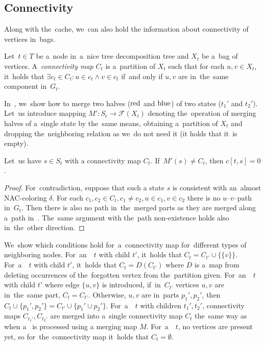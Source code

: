 \subsection{Connectivity}

Along with the~cache, we~can also hold the information about connectivity of
vertices in~bags.
%
\begin{definition}
	Let~\( t \in T \) be a~node in~a~nice tree decomposition tree and
	\( X_t \) be a~bag of vertices.
	A~\emph{connectivity map} \( C_t \) is a~partition of \( X_t \) such that
	for each \( u, v \in X_t \), it~holds that
	\( {\exists c_t \in C_t} : {u \in c_t \land v \in c_t} \) if~and only if
	\( u, v \) are in~the~same component in~\( G_t \).
\end{definition}
%

In~, we~show how to merge
two halves (\( \text{red} \) and \( \text{blue} \)) of two states (\( t_1' \) and \( t_2' \)).
Let~us introduce mapping \( M': S_t \to \mathcal{F}(X_t) \) denoting
the~operation of merging halves of a~single state by the~same means,
obtaining a~partition of \( X_t \) and dropping
the~neighboring relation as we~do not need it
(it holds that it~is empty).
%
\begin{lemma}
	Let~us have \( s \in S_t \) with a connectivity map \( C_t \).
	If~\( M'(s) \ne C_t \), then \( c[t, s] = 0 \).
\end{lemma}
%
\begin{proof}
	For~contradiction, suppose that such a state \( s \)
	is consistent with an~almost NAC-coloring \( \delta \).
	For each \( c_1, c_2 \in C_t, c_1 \ne c_2, u \in c_1, v \in c_2 \)
	there is no \( u \)--\( v \)--path in~\( G_t \).
	Then there is also no path in~the~merged parts as
	they are merged along a~path in~.
	The~same argument with the~path non-existence
	holds also in~the~other direction.
\end{proof}
%
We~show which conditions hold for~a~connectivity map
for~different types of neighboring nodes.
%
For~an~\IntroduceVertexNode{}~\( t \) with child \( t' \), it~holds that
\( C_t = C_{t'} \cup \{\{ v \}\} \).
%
For~a~\ForgetVertexNode{}~\( t \) with child \( t' \), it~holds that
\( C_t = D(C_{t'}) \)
where \( D \) is a~map from 
deleting occurrences of the~forgotten vertex from the~partition given.
%
For~an~\IntroduceEdgeNode{}~\( t \) with child \( t' \)
where edge \( \{u, v\} \) is introduced,
if~in~\( C_{t'} \) vertices \( u, v \) are in~the~same part, \( C_t = C_{t'} \).
Otherwise, \( u, v \) are in~parts \( p_1', p_2' \), then
\( C_t \cup \{p_1', p_2'\} = C_{t'} \cup \{ p_1' \cup p_2'\} \).
%
For~a~\JoinNode{}~\( t \) with children \( t_1', t_2' \),
connectivity maps \( C_{t_1'}, C_{t_2'} \) are merged into
a~single connectivity map \( C_t \)
the~same way as when a~\JoinNode{} is processed using a merging map \( M \).
%
For~a~\LeafNode{}~\( t \),
no vertices are present yet, so for~the~connectivity map it~holds that \( C_t = \emptyset \).


